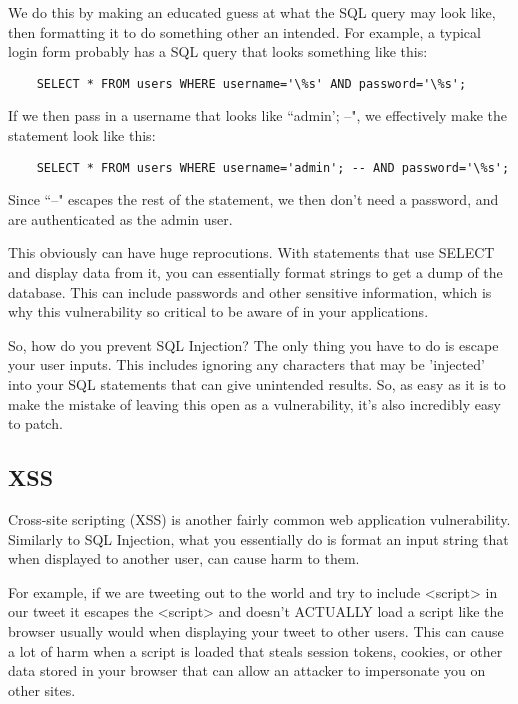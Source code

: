 \documentclass{report}
\begin{document}
We do this by making an educated guess at what the SQL query may look like,
then formatting it to do something other an intended. For example, a typical
login form probably has a SQL query that looks something like this:

\begin{verbatim}
    SELECT * FROM users WHERE username='\%s' AND password='\%s';
\end{verbatim}

If we then pass in a username that looks like ``admin'; --", we effectively
make the statement look like this:

\begin{verbatim}
    SELECT * FROM users WHERE username='admin'; -- AND password='\%s';
\end{verbatim}

Since ``--" escapes the rest of the statement, we then don't need a password,
and are authenticated as the admin user.

This obviously can have huge reprocutions. With statements that use SELECT and
display data from it, you can essentially format strings to get a dump of the
database. This can include passwords and other sensitive information, which
is why this vulnerability so critical to be aware of in your applications.

So, how do you prevent SQL Injection? The only thing you have to do is escape
your user inputs. This includes ignoring any characters that may be 'injected'
into your SQL statements that can give unintended results. So, as easy as it
is to make the mistake of leaving this open as a vulnerability, it's also
incredibly easy to patch.

\subsection*{XSS}

Cross-site scripting (XSS) is another fairly common web application
vulnerability. Similarly to SQL Injection, what you essentially do is format
an input string that when displayed to another user, can cause harm to them.

For example, if we are tweeting out to the world and try to include <script>
in our tweet it escapes the <script> and doesn't ACTUALLY load a script
like the browser usually would when displaying your tweet to other users. This
can cause a lot of harm when a script is loaded that steals session tokens,
cookies, or other data stored in your browser that can allow an attacker to
impersonate you on other sites. 
\end{document}
